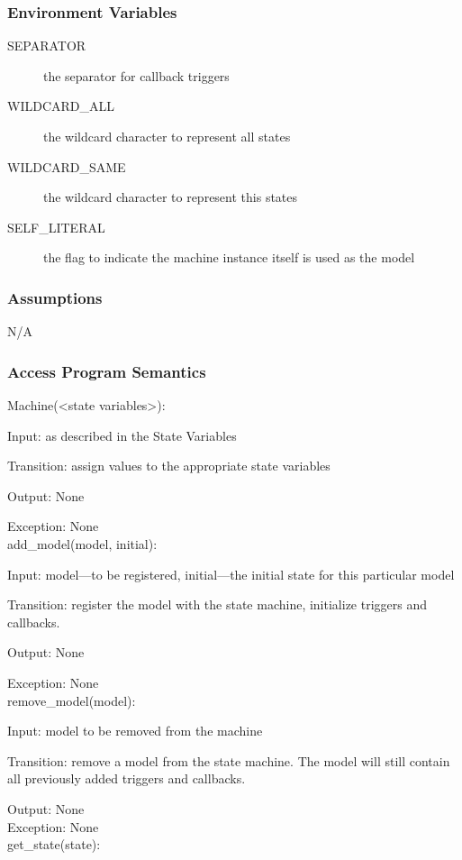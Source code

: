 \documentclass[12pt,titlepage]{article}
\begin{document}
\subsubsection{Environment Variables}
\begin{description}
\item[SEPARATOR] the separator for callback triggers
\item[WILDCARD\_ALL] the wildcard character to represent all states
\item[WILDCARD\_SAME] the wildcard character to represent this states
\item[SELF\_LITERAL] the flag to indicate the machine instance itself is used as
  the model
\end{description}

\subsubsection{Assumptions}
N/A

\subsubsection{Access Program Semantics}

Machine(<state variables>):

Input: as described in the State Variables

Transition: assign values to the appropriate state variables

Output: None

Exception: None\\
add\_model(model, initial):

Input: model---to be registered, initial---the initial state for this particular
model

Transition: register the model with the state machine, initialize triggers and
callbacks.

Output: None

Exception: None\\
remove\_model(model):

Input: model to be removed from the machine

Transition: remove a model from the state machine. The model will still contain
all previously added triggers and callbacks.

Output: None \\

Exception: None \\
get\_state(state):
\end{document}
